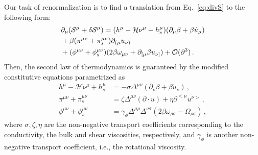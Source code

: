 \documentclass[prl,superscriptaddress,twocolumn,
  showpacs,preprintnumbers,amsmath,amssymb]{revtex4-1}
\begin{document}
Our task of renormalization is to find a translation from Eq.~\eqref{eq:divS} to the following form:
\begin{align}
  &\partial_\mu (\mathcal{S}^\mu + \delta\mathcal{S}^\mu)
  = (h^\mu-\mathcal{H}\nu^\mu+h_s^\mu)(\partial_\mu\beta+\beta\dot{u}_{\mu}) \notag\\
  & + \beta(\pi^{\mu\nu}+\pi_{s}^{\mu\nu})\partial_{(\mu}u_{\nu)} \notag\\
  & + (\phi^{\mu\nu}+\phi_s^{\mu\nu})(2\beta\omega_{\mu\nu} + \partial_{[\mu} \beta u_{\nu]} )
    + \mathcal{O}(\partial^3)\,.
    \label{eq:divSren}
\end{align}
Then, the second law of thermodynamics is guaranteed by the modified constitutive equations parametrized as
\begin{subequations}
  \begin{align}
  h^\mu - \mathcal{H}\nu^\mu + h_s^\mu & = -\sigma\Delta^{\mu\nu}(\partial_{\nu}\beta + \beta \dot{u}_\nu)\,,
  \label{eq:dissipative_02_1}\\
  \pi^{\mu\nu} + \pi_s^{\mu\nu} & = \zeta\Delta^{\mu\nu}(\partial\cdot u) + \eta\partial^{<\mu}u^{\nu>}\,,
  \label{eq:dissipative_02_2}\\
  \phi^{\mu\nu} + \phi_s^{\mu\nu} & = \gamma_\phi\Delta^{\mu\rho}\Delta^{\nu\sigma}(2\beta\omega_{\rho\sigma} - \Omega_{\rho\sigma} )\,,
  \label{eq:dissipative_02}
  \end{align}
\end{subequations}
where $\sigma,\zeta,\eta$ are the non-negative transport coefficients corresponding to the conductivity, the bulk and shear viscosities, respectively, and $\gamma_\phi$ is another non-negative transport coefficient, i.e., the rotational viscosity.
\end{document}
